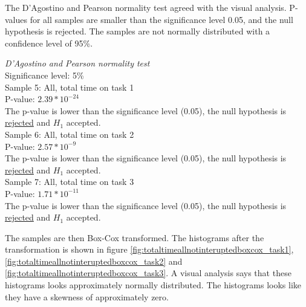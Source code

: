 The D'Agostino and Pearson normality test agreed with the visual analysis. P-values for all samples are smaller than the significance level 0.05, and the null hypothesis is rejected. The samples are not normally distributed with a confidence level of 95\%.\\[0.5cm]

\begin{center}
	\begin{tcolorbox}[box align=center,width=\textwidth-5cm]
		\centering
		\textit{D'Agostino and Pearson normality test}\\
		Significance level: 5\%  \\[0.5cm]
		
		Sample 5: All, total time on task 1 \\
		P-value: $2.39 * 10^{-24}$\\
		The p-value is lower than the significance level (0.05), the null hypothesis is \underline{rejected} and $H_1$ accepted.\\[0.5cm]
		
		Sample 6: All, total time on task 2 \\
		P-value: $2.57 * 10^{-9}$ \\
		The p-value is lower than the significance level (0.05), the null hypothesis is \underline{rejected} and $H_1$ accepted.\\[0.5cm]
		
		Sample 7: All, total time on task 3 \\
		P-value: $1.71 * 10^{-11}$ \\
		The p-value is lower than the significance level (0.05), the null hypothesis is \underline{rejected} and $H_1$ accepted.\\[0.5cm]
	\end{tcolorbox} 
\end{center}

The samples are then Box-Cox transformed. The histograms after the transformation is shown in figure \ref{fig:totaltimeallnotinteruptedboxcox_task1}, \ref{fig:totaltimeallnotinteruptedboxcox_task2} and \ref{fig:totaltimeallnotinteruptedboxcox_task3}. A visual analysis says that these histograms looks approximately normally distributed. The histograms looks like they have a skewness of approximately zero. 

